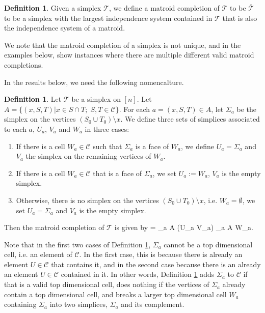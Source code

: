 \documentclass[11pt]{article}
\def\ba #1\ea{\begin{align} #1 \end{align}}
\newcommand{\sC}{\mathscr{C}}
\newcommand{\cT}{\mathcal{T}}
\theoremstyle{remark}
\theoremstyle{definition}
\newtheorem{dfn}[thm]{Definition}
\begin{document}
\begin{dfn}
Given a simplex $\cT$, we define a matroid completion of $\cT$ to be $\overline{\cT}$ to be a simplex with the largest independence system contained in $\cT$ that is also the independence system of a matroid.
\end{dfn}

We note that the matroid completion of a simplex is not unique, and in the examples below, show instances where there are multiple different valid matroid completions. 

In the results below, we need the following nomencalture.

\begin{dfn} \label{dfn:matroidcompletion}
Let $\cT$ be a simplex on $[n]$. Let $A = \{ (x, S, T) | x \in S \cap T; \; S, T \in \sC\}$.  For each $a= (x, S, T) \in A$, let $\Sigma_a$ be the simplex on the vertices $(S_0 \cup T_0)\setminus x$. We define three sets of simplices associated to each $a$, $U_a$, $V_a$ and $W_a$ in three cases:
\begin{enumerate}
\item If there is a cell $W_a \in \sC$ such that $\Sigma_a$ is a face of $W_a$, we define $U_a = \Sigma_a$ and $V_a$ the simplex on the remaining vertices of $W_a$. 
\item If there is a cell $W_a \in \sC$ that is a face of $\Sigma_a$, we set $U_a := W_a$, $V_a$ is the empty simplex. 
\item Otherwise, there is no simplex on the vertices $(S_0 \cup T_0)\setminus x$, i.e. $W_a = \emptyset$, we set $U_a = \Sigma_a$ and $V_a$ is the empty simplex.
\end{enumerate}
Then the matroid completion of $\cT$ is given by \ba \overline{\cT} = \cT \bigcup_{a \in A} (U_a \cup V_a) \setminus \bigcup_{a \in A} W_a\;. \label{eq:matroidcompletion}\ea 
\end{dfn}

Note that in the first two cases of Definition \ref{dfn:matroidcompletion}, $\Sigma_a$ cannot be a top dimensional cell, i.e. an element of $\sC$. In the first case, this is because there is already an element $U \in \sC$ that contains it, and in the second case because there is an already an element $U \in \sC$ contained in it. In other words, Definition \ref{dfn:matroidcompletion} adds $\Sigma_a$ to $\sC$ if that is a valid top dimensional cell, does nothing if the vertices of $\Sigma_a$ already contain a top dimensional cell, and breaks a larger top dimensional cell $W_a$ containing $\Sigma_a$ into two simplices, $\Sigma_a$ and its complement.
\end{document}
